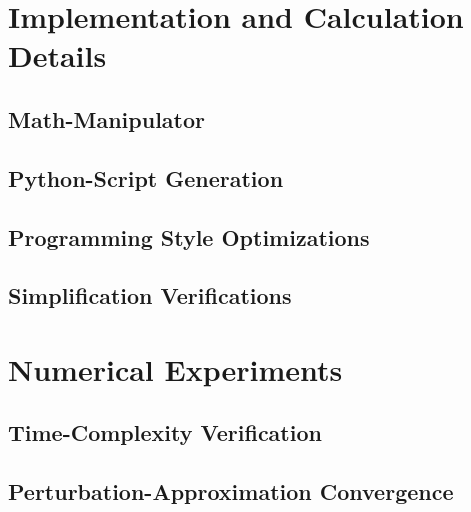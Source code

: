 \documentclass[
headings=optiontohead,              %
12pt,                               %
DIV=13,                             %
twoside=false,                      %
open=right,                         %
BCOR=00mm,                          %
toc=bibliographynumbered            %
]{scrreport}
\begin{document}
\chapter{Implementation and Calculation Details}
\label{sec:implementation-details}

\FloatBarrier

    \section{Math-Manipulator}
    \label{sec:implementation-details-math-manipulator}
    
    \FloatBarrier

    \section{Python-Script Generation}
    \label{sec:implementation-details-script-generation}
    
    \FloatBarrier

    \section{Programming Style Optimizations}
    \label{sec:implementation-details-style-optimizations}
    
    \FloatBarrier

    \section{Simplification Verifications}
    \label{sec:implementation-details-simplification-verifications}
    
    \FloatBarrier

\chapter{Numerical Experiments}
\label{sec:experiments-numerical}

\FloatBarrier

    \section{Time-Complexity Verification}
    \label{sec:experiments-time-complexity}
    
    \FloatBarrier

    \section{Perturbation-Approximation Convergence}
    \label{sec:experiments-perturbation-convergence}
    
    \FloatBarrier
\end{document}

